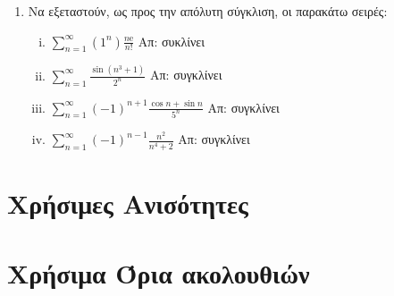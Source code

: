 \documentclass[a4paper,table]{report}
\begin{document}
\begin{enumerate}
  \item Να εξεταστούν, ως προς την απόλυτη σύγκλιση, οι παρακάτω σειρές: 

    \begin{enumerate}[i)]
      \item $ \sum_{n=1}^{\infty} (1^{n}) \frac{n \mathrm{e}}{n!} $ 
        \hfill Απ: συκλίνει
      \item $ \sum_{n=1}^{\infty} \frac{\sin{(n^{3}+1)}}{2^{n}} $ \hfill Απ: συγκλίνει 
      \item $ \sum_{n=1}^{\infty} (-1)^{n+1} \frac{\cos{n} + \sin{n}}{5^{n}} $ 
        \hfill Απ: συγκλίνει 
      \item $ \sum_{n=1}^{\infty} (-1)^{n-1} \frac{n^{2}}{n^{4}+2} $ 
        \hfill Απ: συγκλίνει 
    \end{enumerate}
\end{enumerate}

\section*{Χρήσιμες Ανισότητες}



\section*{Χρήσιμα Όρια ακολουθιών}
\end{document}
